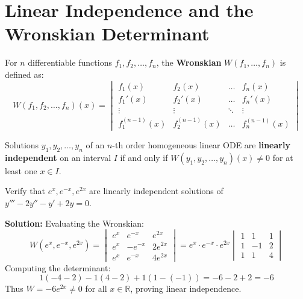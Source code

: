 \documentclass[11pt, a4paper, openany, oneside]{book}
\begin{document}
\section{Linear Independence and the Wronskian Determinant}

\begin{definitionbox}
For $n$ differentiable functions $f_1, f_2, \dots, f_n$, the \textbf{Wronskian} $W(f_1, \dots, f_n)$ is defined as:
\begin{equation}
    W(f_1, f_2, \dots, f_n)(x) = 
    \begin{vmatrix}
        f_1(x) & f_2(x) & \dots & f_n(x) \\
        f_1'(x) & f_2'(x) & \dots & f_n'(x) \\
        \vdots & \vdots & \ddots & \vdots \\
        f_1^{(n-1)}(x) & f_2^{(n-1)}(x) & \dots & f_n^{(n-1)}(x)
    \end{vmatrix}
\end{equation}
\end{definitionbox}

\begin{theorembox}
Solutions $y_1, y_2, \dots, y_n$ of an $n$-th order homogeneous linear ODE are \textbf{linearly independent} on an interval $I$ if and only if $W(y_1, y_2, \dots, y_n)(x) \neq 0$ for at least one $x \in I$.
\end{theorembox}

\begin{examplebox}
Verify that $e^x, e^{-x}, e^{2x}$ are linearly independent solutions of $y''' - 2y'' - y' + 2y = 0$.

\textbf{Solution:}
Evaluating the Wronskian:
\[
W(e^x, e^{-x}, e^{2x}) = 
\begin{vmatrix}
    e^x & e^{-x} & e^{2x} \\
    e^x & -e^{-x} & 2e^{2x} \\
    e^x & e^{-x} & 4e^{2x}
\end{vmatrix}
= e^x \cdot e^{-x} \cdot e^{2x}
\begin{vmatrix}
    1 & 1 & 1 \\
    1 & -1 & 2 \\
    1 & 1 & 4
\end{vmatrix}
\]
Computing the determinant:
\[
1(-4 - 2) - 1(4 - 2) + 1(1 - (-1)) = -6 - 2 + 2 = -6
\]
Thus $W = -6 e^{2x} \neq 0$ for all $x \in \mathbb{R}$, proving linear independence.
\end{examplebox}
\end{document}
